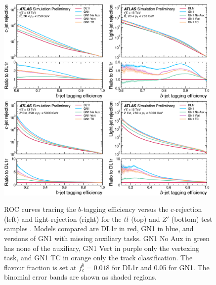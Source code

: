 \begin{figure}[h!]
  \centering
  \includegraphics[width=0.98\textwidth]{Images/FTAG/GN/GN1/ablations/ttb.png}
  \includegraphics[width=0.98\textwidth]{Images/FTAG/GN/GN1/ablations/zpb.png}
  \caption{ROC curves tracing the $b$-tagging efficiency versus the $c$-rejection (left) and light-rejection (right) for the $t\bar{t}$ (top) and $Z'$ (bottom) test samples \cite{ATL-PHYS-PUB-2022-027}. Models compared are DL1r in red, GN1 in blue, and versions of GN1 with missing auxiliary tasks. GN1 No Aux in green has none of the auxiliary, GN1 Vert in purple only the vertexing task, and GN1 TC in orange only the track classification. The flavour fraction is set at $f^b_c = 0.018$ for DL1r and 0.05 for GN1. The binomial error bands are shown as shaded regions.}
  \label{fig:GN1ablb}
\end{figure} 

\newpage

